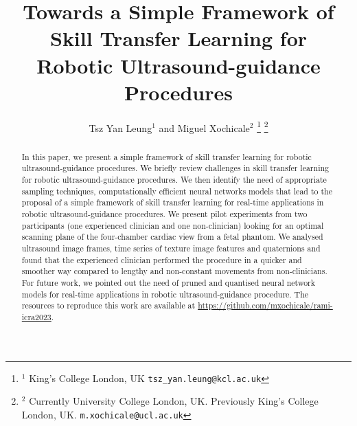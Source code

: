 \documentclass[a4paper, 10pt, conference]{ieeeconf}      %
\title{\LARGE \bf
Towards a Simple Framework of Skill Transfer Learning for \\ Robotic Ultrasound-guidance Procedures %
}
\author{Tsz Yan Leung$^{1}$ and Miguel Xochicale$^{2}$%
\thanks{$^{1}$
	King's College London, UK
       {\tt\small tsz\_yan.leung@kcl.ac.uk}}%
\thanks{$^{2}$
	Currently University College London, UK. 
        Previously King's College London, UK.
        {\tt\small m.xochicale@ucl.ac.uk}}%
}
\begin{document}
\maketitle
\thispagestyle{empty}
\pagestyle{empty}


\begin{abstract}
In this paper, we present a simple framework of skill transfer learning for robotic ultrasound-guidance procedures.
We briefly review challenges in skill transfer learning for robotic ultrasound-guidance procedures.
We then identify the need of appropriate sampling techniques, computationally efficient neural networks models that lead to the proposal of a simple framework of skill transfer learning for real-time applications in robotic ultrasound-guidance procedures.
We present pilot experiments from two participants (one experienced clinician and one non-clinician) looking for an optimal scanning plane of the four-chamber cardiac view from a fetal phantom.
We analysed ultrasound image frames, time series of texture image features and quaternions and found that the experienced clinician performed the procedure in a quicker and smoother way compared to lengthy and non-constant movements from non-clinicians.
For future work, we pointed out
the need of pruned and quantised neural network models
for real-time applications in robotic ultrasound-guidance
procedure.
The resources to reproduce this work are available at \url{https://github.com/mxochicale/rami-icra2023}.
\end{abstract}



\end{document}
